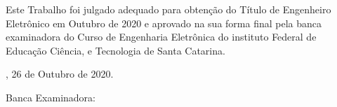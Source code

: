 \documentclass{ifscTCC} %
\begin{document}
%

\setcounter{page}{4}
\begin{folhadeaprovacao}
    \begin{center}
        \begin{center}
            \ABNTEXchapterfont\SingleSpacing\bfseries\Large\MakeUppercase\imprimirtitulo
        \end{center}
            
        \vspace*{2.0cm}
            
        \ABNTEXchapterfont\normalsize\bfseries\MakeUppercase\imprimirautor
            
        \vspace*{1.0cm}
    \end{center}
    
    
    \noindent\OnehalfSpacing Este Trabalho foi julgado adequado para obtenção do Título de Engenheiro Eletrônico em Outubro de 2020 e aprovado na sua forma final pela banca examinadora do Curso de Engenharia Eletrônica do instituto Federal de Educação Ciência, e Tecnologia de Santa Catarina.
        
    \vspace*{1.0cm}
    \begin{center}    
        \imprimirlocal, 26 de Outubro de 2020.
    \end{center}
    
    \noindent Banca Examinadora:
    

\end{folhadeaprovacao}
\cleardoublepage
\end{document}
